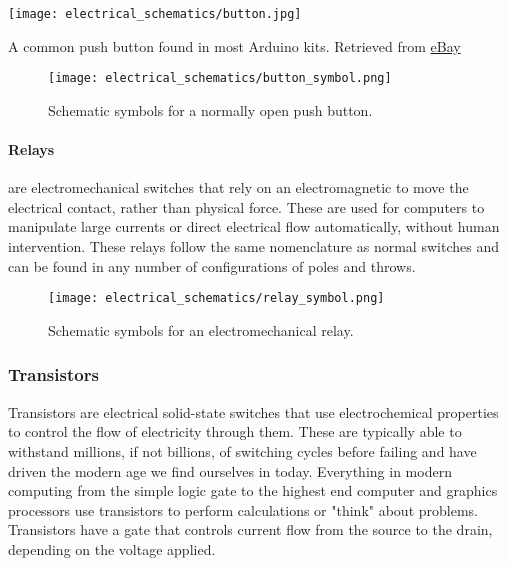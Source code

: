         \begin{marginfigure}[-2in]
            \texttt{[image: electrical\_schematics/button.jpg]}
            \caption{A common push button found in most Arduino kits.
            Retrieved from \href{https://www.ebay.co.uk/itm/10-x-6x6x5mm-Momentary-Mini-Push-Button-Tactile-Switch-PCB-Mounted-SPST-/251779595483}{eBay}}
        \end{marginfigure}

        \begin{figure}[h!]
            \texttt{[image: electrical\_schematics/button\_symbol.png]}
            \caption[Switch Symbols]{Schematic symbols for a normally open push button.}
        \end{figure}

        \paragraph*{Relays} are electromechanical switches that rely on an electromagnetic to move the electrical contact, rather than physical force.
        These are used for computers to manipulate large currents or direct electrical flow automatically, without human intervention.
        These relays follow the same nomenclature as normal switches and can be found in any number of configurations of poles and throws.

        \begin{figure}[h!]
            \texttt{[image: electrical\_schematics/relay\_symbol.png]}
            \caption[Switch Symbols]{Schematic symbols for an electromechanical relay.}
        \end{figure}

        \subsubsection*{Transistors}
        Transistors are electrical solid-state switches that use electrochemical properties to control the flow of electricity through them.
        These are typically able to withstand millions, if not billions, of switching cycles before failing and have driven the modern age we find ourselves in today.
        Everything in modern computing from the simple logic gate to the highest end computer and graphics processors use transistors to perform calculations or "think" about problems.
        Transistors have a gate that controls current flow from the source to the drain, depending on the voltage applied.

